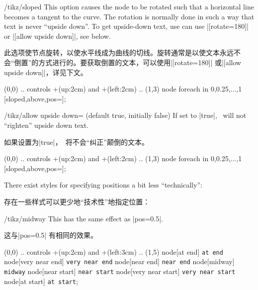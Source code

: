 \begin{key}{/tikz/sloped}
    This option causes the node to be rotated such that a horizontal line
    becomes a tangent to the curve. The rotation is normally done in such a way
    that text is never ``upside down''. To get upside-down text, use can use
    |[rotate=180]| or |[allow upside down]|, see below.
    
    此选项使节点旋转，以使水平线成为曲线的切线。旋转通常是以使文本永远不会“倒置”的方式进行的。要获取倒置的文本，可以使用|[rotate=180]| 或|[allow upside down]|，详见下文。
\begin{codeexample}[]
\tikz \draw (0,0) .. controls +(up:2cm) and +(left:2cm) .. (1,3)
    node foreach \p in {0,0.25,...,1} [sloped,above,pos=\p]{\p};
\end{codeexample}
\begin{codeexample}[]
\end{codeexample}
\end{key}


\begin{key}{/tikz/allow upside down= (default true, initially false)}
    If set to |true|, \tikzname\ will not ``righten'' upside down text.
    
    如果设置为|true|，\tikzname\ 将不会“纠正”颠倒的文本。
\begin{codeexample}[]
  \draw (0,0) .. controls +(up:2cm) and +(left:2cm) .. (1,3)
    node foreach \p in {0,0.25,...,1} [sloped,above,pos=\p]{\p};
\end{codeexample}
\begin{codeexample}[]
\end{codeexample}
\end{key}

There exist styles for specifying positions a bit less ``technically'':

存在一些样式可以更少地“技术性”地指定位置：


\begin{stylekey}{/tikz/midway}
    This has the same effect as |pos=0.5|.
    
    这与|pos=0.5| 有相同的效果。    
\begin{codeexample}[]
\tikz \draw (0,0) .. controls +(up:2cm) and +(left:3cm) .. (1,5)
       node[at end]          {\texttt{at end}}
       node[very near end]   {\texttt{very near end}}
       node[near end]        {\texttt{near end}}
       node[midway]          {\texttt{midway}}
       node[near start]      {\texttt{near start}}
       node[very near start] {\texttt{very near start}}
       node[at start]        {\texttt{at start}};
\end{codeexample}
\end{stylekey}

